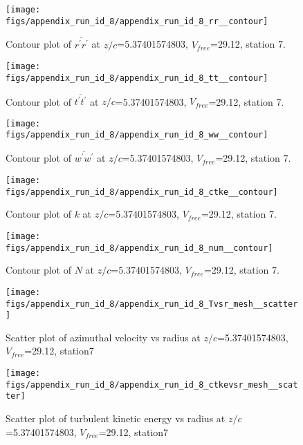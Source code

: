 \begin{figure}[H]
\centering
\texttt{[image: figs/appendix\_run\_id\_8/appendix\_run\_id\_8\_rr\_\_contour]}
\caption{Contour plot of $\overline{r^\prime r^\prime}$ at $z/c$=5.37401574803, $V_{free}$=29.12, station 7.}
\label{fig:appendix_run_id_8_rr__contour}
\end{figure}


\begin{figure}[H]
\centering
\texttt{[image: figs/appendix\_run\_id\_8/appendix\_run\_id\_8\_tt\_\_contour]}
\caption{Contour plot of $\overline{t^\prime t^\prime}$ at $z/c$=5.37401574803, $V_{free}$=29.12, station 7.}
\label{fig:appendix_run_id_8_tt__contour}
\end{figure}


\begin{figure}[H]
\centering
\texttt{[image: figs/appendix\_run\_id\_8/appendix\_run\_id\_8\_ww\_\_contour]}
\caption{Contour plot of $\overline{w^\prime w^\prime}$ at $z/c$=5.37401574803, $V_{free}$=29.12, station 7.}
\label{fig:appendix_run_id_8_ww__contour}
\end{figure}


\begin{figure}[H]
\centering
\texttt{[image: figs/appendix\_run\_id\_8/appendix\_run\_id\_8\_ctke\_\_contour]}
\caption{Contour plot of $k$ at $z/c$=5.37401574803, $V_{free}$=29.12, station 7.}
\label{fig:appendix_run_id_8_ctke__contour}
\end{figure}


\begin{figure}[H]
\centering
\texttt{[image: figs/appendix\_run\_id\_8/appendix\_run\_id\_8\_num\_\_contour]}
\caption{Contour plot of $N$ at $z/c$=5.37401574803, $V_{free}$=29.12, station 7.}
\label{fig:appendix_run_id_8_num__contour}
\end{figure}


\begin{figure}[H]
\centering
\texttt{[image: figs/appendix\_run\_id\_8/appendix\_run\_id\_8\_Tvsr\_mesh\_\_scatter]}
\caption{Scatter plot of azimuthal velocity vs radius at $z/c$=5.37401574803, $V_{free}$=29.12, station7}
\label{fig:appendix_run_id_8_Tvsr_mesh__scatter}
\end{figure}


\begin{figure}[H]
\centering
\texttt{[image: figs/appendix\_run\_id\_8/appendix\_run\_id\_8\_ctkevsr\_mesh\_\_scatter]}
\caption{Scatter plot of turbulent kinetic energy vs radius at $z/c$=5.37401574803, $V_{free}$=29.12, station7}
\label{fig:appendix_run_id_8_ctkevsr_mesh__scatter}
\end{figure}



